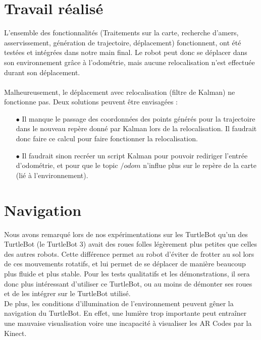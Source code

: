 \documentclass[10pt,a4paper]{article}
\begin{document}
\section{Travail réalisé}

L'ensemble des fonctionnalités (Traitements sur la carte, recherche d'amers, asservissement, génération de trajectoire, déplacement) fonctionnent, ont été testées et intégrées dans notre main final. Le robot peut donc se déplacer dans son environnement grâce à l'odométrie, mais aucune relocalisation n'est effectuée durant son déplacement.\\\\
Malheureusement, le déplacement avec relocalisation (filtre de Kalman) ne fonctionne pas. Deux solutions peuvent être envisagées :
\begin{itemize}
\item[$\bullet$]
	Il manque le passage des coordonnées des points générés pour la trajectoire dans le nouveau repère donné par Kalman lors de la relocalisation. Il faudrait donc faire ce calcul pour faire fonctionner la relocalisation.
\item[$\bullet$]
	Il faudrait sinon recréer un script Kalman pour pouvoir rediriger l'entrée d'odométrie, et pour que le topic $/odom$ n'influe plus sur le repère de la carte (lié à l'environnement).
\end{itemize}


\newpage
\section{Navigation}
\label{sec:Navigation}


Nous avons remarqué lors de nos expérimentations sur les TurtleBot qu'un des TurtleBot (le TurtleBot 3) avait des roues folles légèrement plus petites que celles des autres robots. Cette différence permet au robot d'éviter de frotter au sol lors de ces mouvements rotatifs, et lui permet de se déplacer de manière beaucoup plus fluide et plus stable. Pour les tests qualitatifs et les démonstrations, il sera donc plus intéressant d'utiliser ce TurtleBot, ou au moins de démonter ses roues et de les intégrer sur le TurtleBot utilisé.\\

De plus, les conditions d'illumination de l'environnement peuvent gêner la navigation du TurtleBot. En effet, une lumière trop importante peut entraîner une mauvaise visualisation voire une incapacité à visualiser les AR Codes par la Kinect. \\
\end{document}
